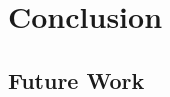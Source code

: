\documentclass[a4paper,12pt]{report}
\begin{document}
\FloatBarrier


\chapter{Conclusion}
    \section{Future Work}


{}

\end{document}
